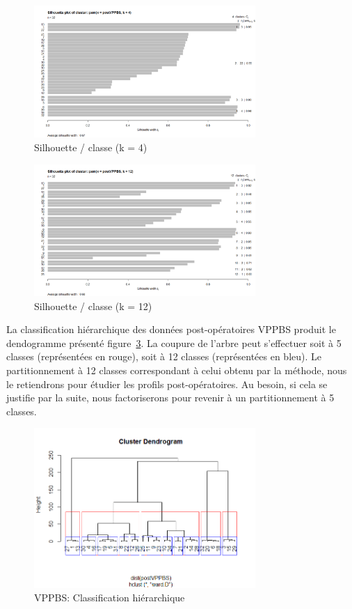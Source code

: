 \begin{figure}[H]
\centering
\includegraphics[width=0.75\textwidth]{../Fig/VPPBS/vppbs-sil-k4-post.png}
\caption[]{Silhouette / classe (k = 4)}
\label{fig-vppbs-post-pam-k4}
\end{figure}


\begin{figure}[H]
\centering
\includegraphics[width=0.75\textwidth]{../Fig/VPPBS/vppbs-sil-k12-post.png}
\caption{Silhouette / classe (k = 12)}
\label{fig-vppbs-post-pam-k12}
\end{figure}

La classification hiérarchique des données post-opératoires VPPBS produit le dendogramme présenté figure~\ref{fig-vppbs-post-cah}. La coupure de l'arbre peut s'effectuer soit à 5 classes (représentées en rouge), soit à 12 classes (représentées en bleu). Le partitionnement à 12 classes correspondant à celui obtenu par la méthode, nous le retiendrons pour étudier les profils post-opératoires. Au besoin, si cela se justifie par la suite, nous factoriserons pour revenir à un partitionnement à 5 classes.

\begin{figure}[H]
\centering
\includegraphics[width=0.75\textwidth]{../Fig/VPPBS/vppbs-cah-k12-post.png}
\caption{VPPBS: Classification hiérarchique}
\label{fig-vppbs-post-cah}
\end{figure}

%
